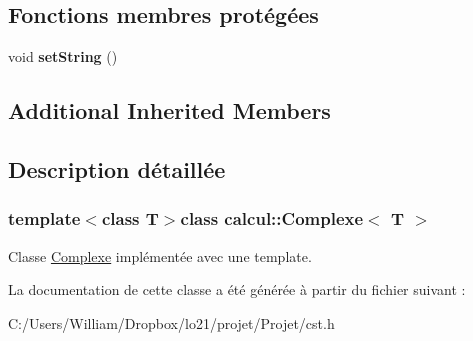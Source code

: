 \subsection*{Fonctions membres protégées}
\begin{DoxyCompactItemize}
\item 
\hypertarget{classcalcul_1_1_complexe_aafcfaebf5bb3e6b9bb89766832429efc}{void {\bfseries set\-String} ()}\label{classcalcul_1_1_complexe_aafcfaebf5bb3e6b9bb89766832429efc}

\end{DoxyCompactItemize}
\subsection*{Additional Inherited Members}


\subsection{Description détaillée}
\subsubsection*{template$<$class T$>$class calcul\-::\-Complexe$<$ T $>$}

Classe \hyperlink{classcalcul_1_1_complexe}{Complexe} implémentée avec une template. 

La documentation de cette classe a été générée à partir du fichier suivant \-:\begin{DoxyCompactItemize}
\item 
C\-:/\-Users/\-William/\-Dropbox/lo21/projet/\-Projet/cst.\-h\end{DoxyCompactItemize}
